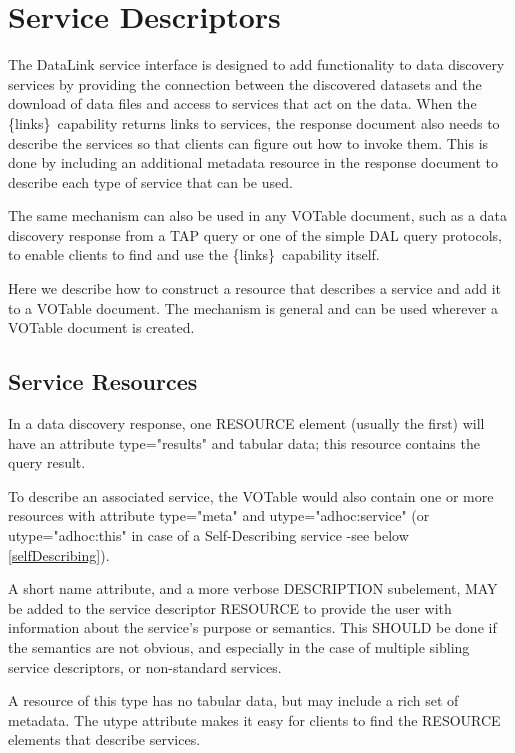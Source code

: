 \documentclass[11pt,a4paper]{ivoa}
\newcommand{\blinks}{\{links\}}
\newcommand{\attval}[2]{#1={\allowbreak}{"}#2{"}}
\begin{document}
\section{Service Descriptors}
\label{sec:serviceDescriptors}

The DataLink service interface is designed to add functionality to data
discovery services by providing the connection between the discovered
datasets and the download of data files and access to services that act
on the data. When the \blinks\ capability returns links to services, the
response document also needs to describe the services so that clients can
figure out how to invoke them. This is done by including an additional
metadata resource in the response document to describe each type of
service that can be used.

The same mechanism can also be used in any VOTable document, such
as a data discovery response from a TAP query or one of the simple
DAL query protocols, to enable clients to find and use the \blinks\
capability itself.

Here we describe how to construct a resource that describes a service
and add it to a VOTable document. The mechanism is general and can be
used wherever a VOTable document is created.


\subsection{Service Resources}
\label{sec:serviceResources}

In a data discovery response, one RESOURCE element (usually the first)
will have an attribute \attval{type}{results} and tabular data; this resource
contains the query result.

To describe an associated service, the VOTable would also
contain one or more resources with attribute \attval{type}{meta} and
\attval{utype}{adhoc:service}  (or \attval{utype}{adhoc:this} in case of
a Self-Describing service -see below \ref{selfDescribing}).

A short name attribute, and a more verbose DESCRIPTION  subelement,
MAY be added to the service descriptor RESOURCE to  provide the user
with information about the service's purpose or  semantics. This SHOULD
be done if the semantics are not obvious,  and especially in the case
of multiple sibling service  descriptors, or non-standard services.

A resource of this type has no tabular data,
but may include a rich set of metadata. The utype attribute makes it
easy for clients to find the RESOURCE elements that describe services.
\end{document}

